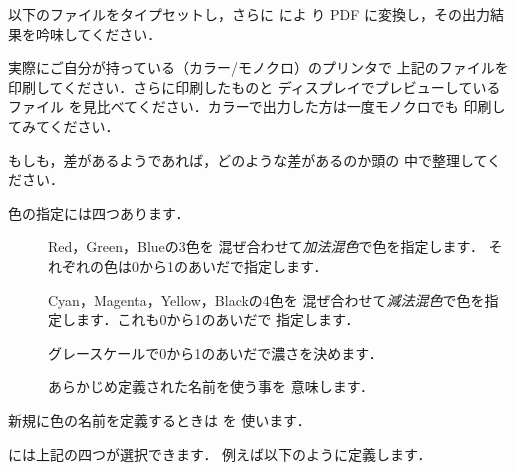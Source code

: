 \begin{Prob}
以下のファイルをタイプセットし，さらに \Dvipdfmx によ
り PDF に変換し，その出力結果を吟味してください．


実際にご自分が持っている（カラー/モノクロ）のプリンタで
上記のファイルを印刷してください．さらに印刷したものと
ディスプレイでプレビューしているファイル
を見比べてください．カラーで出力した方は一度モノクロでも
印刷してみてください．

もしも，差があるようであれば，どのような差があるのか頭の
中で整理してください．
\end{Prob}

色の指定には四つあります．
\begin{description}
 \item[] Red，Green，Blueの3色を
 混ぜ合わせて\emph{加法混色}で色を指定します．
 それぞれの色は0から1のあいだで指定します．
 \item[] Cyan，Magenta，Yellow，Blackの4色を
 混ぜ合わせて\emph{減法混色}で色を指定します．これも0から1のあいだで
 指定します．
 \item[] グレースケールで0から1のあいだで濃さを決めます．
 \item[] あらかじめ定義された名前を使う事を
 意味します．
\end{description}

新規に色の名前を定義するときは を
使います．
\begin{Syntax}
\end{Syntax}
には上記の四つが選択できます．
例えば以下のように定義します．

